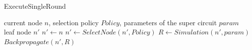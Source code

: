 \documentclass{ieeeaccess}
\begin{document}
\begin{algorithm}[H]
\caption{ExecuteSingleRound}\label{alg:executeSingleRound}
\begin{algorithmic}
\Require current node $n$, selection policy $Policy$, parameters of the super circuit $param$
\Ensure leaf node $n'$
\State $n'\gets n$
\State $n'\gets SelectNode(n', Policy)$
\EndWhile
\State $R \gets Simulation(n', param)$  
\State $Backpropagate(n', R)$ 
\end{algorithmic}
\end{algorithm}
















\typeout{} 




\EOD
\end{document}
